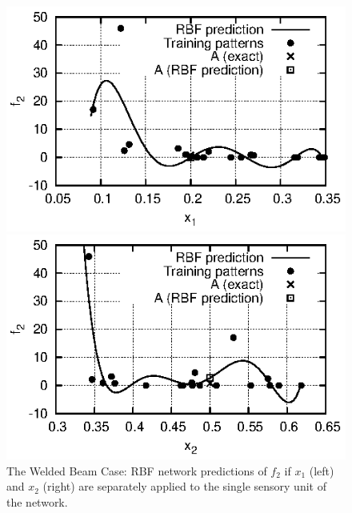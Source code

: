 \begin{figure}
\begin{minipage}{0.48\textwidth}
\includegraphics[scale=1.2]{IPE/f2_x1.eps}
\end{minipage}
\begin{minipage}{0.48\textwidth}
\includegraphics[scale=1.2]{IPE/f2_x2.eps}
\end{minipage}
\caption{The Welded Beam Case: RBF network predictions of $f_2$ if $x_1$ (left) and $x_2$ (right) are separately applied to the single sensory unit of the network. }
\label{fig:f2x1x2}
\end{figure}

